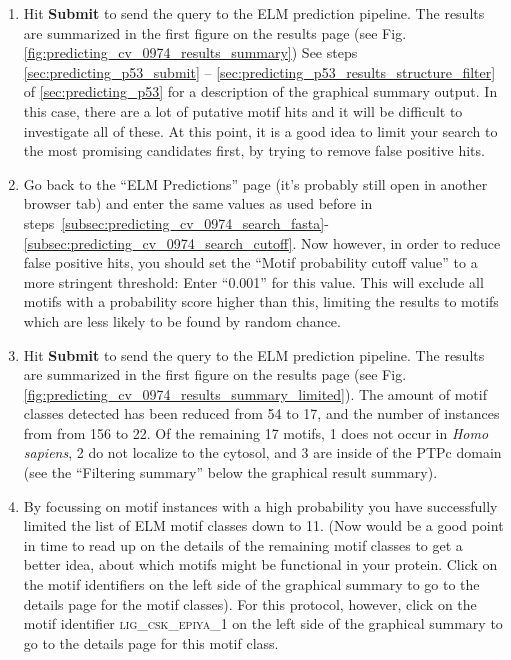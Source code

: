 \documentclass[12pt]{article}
\newcounter{proto}
\newcommand\button[1]{%
	\textbf{#1}%
}
\newcommand\motif[1]{%
    \textsc{\lowercase{#1}}%
}
\begin{document}
\begin{enumerate}
%
%

\item Hit \button{Submit} to send the query to the ELM prediction pipeline.
    The results are summarized in the first figure on the results page
	(see Fig. \ref{fig:predicting_cv_0974_results_summary})
    See steps \ref{sec:predicting_p53_submit} -- \ref{sec:predicting_p53_results_structure_filter}
    of \ref{sec:predicting_p53} for a description of the
    graphical summary output. In this case, there are a lot of putative motif
    hits and it will be difficult to investigate all of these. At this point, it is a good idea
    to limit your search to the most promising candidates first, by trying to remove
    false positive hits.

\item Go back to the ``ELM Predictions'' page (it's probably still open in
    another browser tab) and enter the same values as used before in
	steps~\ref{subsec:predicting_cv_0974_search_fasta}-\ref{subsec:predicting_cv_0974_search_cutoff}.
	Now however, in order to reduce false positive hits,
    you should set the ``Motif probability cutoff value'' to a more
	stringent threshold: Enter ``0.001'' for this value. This will exclude
	all motifs with a probability score higher than this, limiting the
	results to motifs which are less likely to be found by random
	chance.

\item Hit \button{Submit} to send the query to the ELM prediction pipeline.
    The results are summarized in the first figure on the results page
	(see Fig. \ref{fig:predicting_cv_0974_results_summary_limited}).
    The amount of motif classes detected has been
    reduced from 54 to 17, and the number of instances from
    from 156 to 22. Of the remaining 17 motifs, 1 does not occur in
    \textit{Homo sapiens}, 2 do not localize to the cytosol, and 3 are inside
    of the PTPc domain (see the ``Filtering summary'' below the graphical
    result summary).

\item By focussing on motif instances with a high probability
    you have successfully limited the list of ELM motif classes down to 11.
    (Now would be a good point in time to read up on the details of the
    remaining motif classes to get a better idea, about which motifs might be
    functional in your protein. Click on the motif identifiers on the left side
    of the graphical summary to go to the details page for the motif classes).
    For this protocol, however, click on the motif identifier
    \motif{LIG\_CSK\_EPIYA\_1} on the left side of the graphical summary to go
    to the details page for this motif class.


\end{enumerate}
\end{document}
